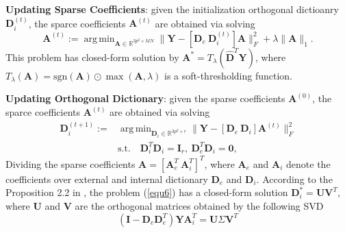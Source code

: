 \documentclass[10pt,twocolumn,letterpaper]{article}
\DeclareMathOperator*{\argmin}{arg\,min}
\begin{document}
\textbf{Updating Sparse Coefficients}: given the initialization orthogonal dictioanry $\textbf{D}_{i}^{(t)}$, the sparce coefficients 
$\textbf{A}^{(t)}$ are obtained via solving
\begin{equation}\label{equ5}
\textbf{A}^{(t)}:=\argmin_{\textbf{A}\in\mathbb{R}^{3p^2\times MN}}
\|\mathbf{Y}-[\mathbf{D}_{e}\ \mathbf{D}_{i}^{(t)}]\mathbf{A}\|_{F}^{2}+\lambda\|\mathbf{A}\|_{1}.
\end{equation}
This problem has closed-form solution by $\mathbf{A}^{*}=T_{\lambda}(\mathbf{\hat{D}}^{T}\mathbf{Y})$, 
where $T_{\lambda}(\mathbf{A}) = \text{sgn}(\mathbf{A})\odot\max(\mathbf{A},\lambda)$ is a soft-thresholding function.

\textbf{Updating Orthogonal Dictionary}: given the sparse coefficients $\textbf{A}^{(0)}$, the sparce coefficients 
$\textbf{A}^{(t)}$ are obtained via solving
\begin{equation}\label{equ6} 
\begin{split}
\textbf{D}_{i}^{(t+1)}:=
&
\argmin_{\textbf{D}_{i}\in\mathbb{R}^{3p^2\times r}}
\|\mathbf{Y}-[\mathbf{D}_{e}\ \mathbf{D}_{i}]\mathbf{A}^{(t)}\|_{F}^{2}
\\
&
\text{s.t.}
\quad
\mathbf{D}_{i}^{T}\mathbf{D}_{i} = \mathbf{I}_{r},\ \mathbf{D}_{e}^{T}\mathbf{D}_{i} = \mathbf{0},
\end{split}
\end{equation}
Dividing the sparse coefficients $\mathbf{A}=[\mathbf{A}_{e}^{T}\ \mathbf{A}_{i}^{T}]^{T}$, where $\mathbf{A}_{e}$ and $\mathbf{A}_{i}$ denote the coefficients over external and internal dictionary $\mathbf{D}_{e}$ and $\mathbf{D}_{i}$. According to the Proposition 2.2 in \cite{bao2013fast}, the problem (\ref{equ6}) 
has a closed-form solution $\mathbf{D}_{i}^{*}=\mathbf{U}\mathbf{V}^{T}$, where $\mathbf{U}$ and $\mathbf{V}$ are
the orthogonal matrices obtained by the following SVD
\begin{equation}\label{equ7}
(\mathbf{I}-\mathbf{D}_{e}\mathbf{D}_{e}^{T})\mathbf{Y}\mathbf{A}_{i}^{T}
=
\mathbf{U}\Sigma\mathbf{V}^{T}
\end{equation}
\end{document}

